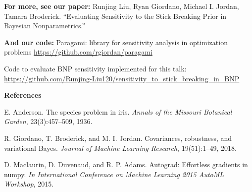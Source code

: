 \documentclass[10pt]{beamer}\usepackage[]{graphicx}\usepackage[]{color}
\begin{document}
\begin{frame}

{\bf For more, see our paper: }\newline
Runjing Liu, Ryan Giordano, Michael I. Jordan, Tamara Broderick. \newline
“Evaluating Sensitivity to the Stick Breaking Prior in Bayesian Nonparametrics.” 

{\bf And our code: }\newline
Paragami: library for sensitivity analysis in optimization problems \newline
{\color{blue}\url{https://github.com/rgiordan/paragami}}

Code to evaluate BNP sensitivity implemented for this talk: 
{\color{blue}\url{https://github.com/Runjing-Liu120/sensitivity_to_stick_breaking_in_BNP}}

\vspace{0.2in}

\begin{scriptsize}

{\bf References}

E. Anderson. The species problem in iris. {\itshape Annals of the Missouri Botanical Garden}, 23(3):457–509, 1936.

R. Giordano, T. Broderick, and M. I. Jordan. Covariances, robustness, and variational Bayes. {\itshape Journal of Machine Learning Research}, 19(51):1–49, 2018.

D. Maclaurin, D. Duvenaud, and R. P. Adams. Autograd: Effortless gradients in numpy. {\itshape In International Conference on Machine Learning 2015 AutoML Workshop}, 2015.

\end{scriptsize}

\end{frame}
\end{document}
